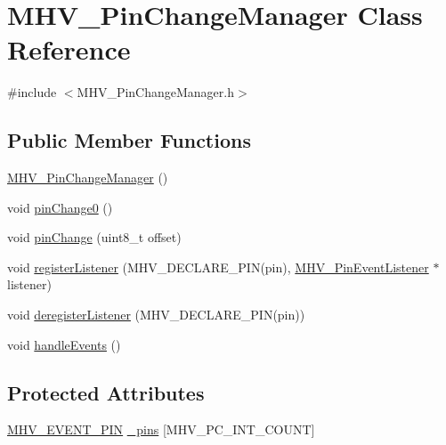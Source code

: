 \hypertarget{class_m_h_v___pin_change_manager}{
\section{\-M\-H\-V\-\_\-\-Pin\-Change\-Manager \-Class \-Reference}
\label{class_m_h_v___pin_change_manager}
}


{\ttfamily \#include $<$\-M\-H\-V\-\_\-\-Pin\-Change\-Manager.\-h$>$}

\subsection*{\-Public \-Member \-Functions}
\begin{DoxyCompactItemize}
\item 
\hyperlink{class_m_h_v___pin_change_manager_a0f53c32cf969c858e7c0f5127f8ed760}{\-M\-H\-V\-\_\-\-Pin\-Change\-Manager} ()
\item 
void \hyperlink{class_m_h_v___pin_change_manager_a2e13f1107ef9406dd224f404176e4fde}{pin\-Change0} ()
\item 
void \hyperlink{class_m_h_v___pin_change_manager_af607081980ab2858f718f6ed0ae0f9f1}{pin\-Change} (uint8\-\_\-t offset)
\item 
void \hyperlink{class_m_h_v___pin_change_manager_a98acb7ef6fb6eab4cf35701e856de955}{register\-Listener} (\-M\-H\-V\-\_\-\-D\-E\-C\-L\-A\-R\-E\-\_\-\-P\-I\-N(pin), \hyperlink{class_m_h_v___pin_event_listener}{\-M\-H\-V\-\_\-\-Pin\-Event\-Listener} $\ast$listener)
\item 
void \hyperlink{class_m_h_v___pin_change_manager_a0178ee5bb5a493985a507e8aaf3e8263}{deregister\-Listener} (\-M\-H\-V\-\_\-\-D\-E\-C\-L\-A\-R\-E\-\_\-\-P\-I\-N(pin))
\item 
void \hyperlink{class_m_h_v___pin_change_manager_a241ab368e927b544737adadc2c4b45d0}{handle\-Events} ()
\end{DoxyCompactItemize}
\subsection*{\-Protected \-Attributes}
\begin{DoxyCompactItemize}
\item 
\hyperlink{_m_h_v___pin_change_manager_8h_a8690da5e1dbb6f0cb21bdb56a4982a66}{\-M\-H\-V\-\_\-\-E\-V\-E\-N\-T\-\_\-\-P\-I\-N} \hyperlink{class_m_h_v___pin_change_manager_afe6febbf14bb802401734219ef6b2eec}{\-\_\-pins} \mbox{[}\-M\-H\-V\-\_\-\-P\-C\-\_\-\-I\-N\-T\-\_\-\-C\-O\-U\-N\-T\mbox{]}
\end{DoxyCompactItemize}


